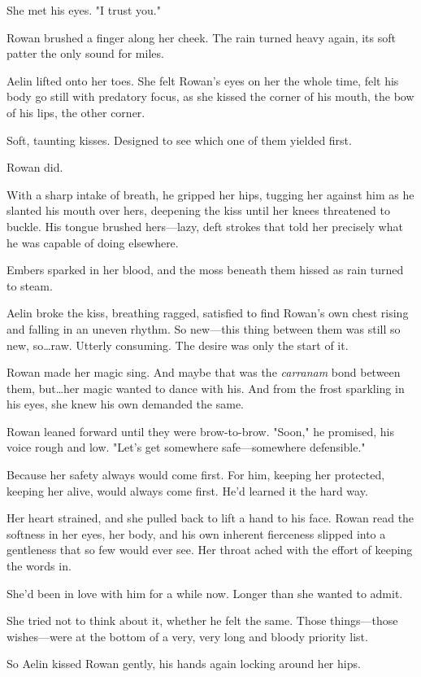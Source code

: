 She met his eyes.
"I trust you."

Rowan brushed a finger along her cheek.
The rain turned heavy again, its soft patter the only sound for miles.

Aelin lifted onto her toes.
She felt Rowan's eyes on her the whole time, felt his body go still with predatory focus, as she kissed the corner of his mouth, the bow of his lips, the other corner.

Soft, taunting kisses.
Designed to see which one of them yielded first.

Rowan did.

With a sharp intake of breath, he gripped her hips, tugging her against him as he slanted his mouth over hers, deepening the kiss until her knees threatened to buckle.
His tongue brushed hers---lazy, deft strokes that told her precisely what he was capable of doing elsewhere.

Embers sparked in her blood, and the moss beneath them hissed as rain turned to steam.

Aelin broke the kiss, breathing ragged, satisfied to find Rowan's own chest rising and falling in an uneven rhythm.
So new---this thing between them was still so new, so\ldots raw.
Utterly consuming.
The desire was only the start of it.

Rowan made her magic sing.
And maybe that was the \emph{carranam} bond between them, but\ldots her magic wanted to dance with his.
And from the frost sparkling in his eyes, she knew his own demanded the same.

Rowan leaned forward until they were brow-to-brow.
"Soon," he promised, his voice rough and low.
"Let's get somewhere safe---somewhere defensible."

Because her safety always would come first.
For him, keeping her protected, keeping her alive, would always come first.
He'd learned it the hard way.

Her heart strained, and she pulled back to lift a hand to his face.
Rowan read the softness in her eyes, her body, and his own inherent fierceness slipped into a gentleness that so few would ever see.
Her throat ached with the effort of keeping the words in.

She'd been in love with him for a while now.
Longer than she wanted to admit.

She tried not to think about it, whether he felt the same.
Those things---those wishes---were at the bottom of a very, very long and bloody priority list.

So Aelin kissed Rowan gently, his hands again locking around her hips.


